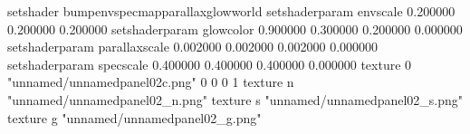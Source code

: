 setshader bumpenvspecmapparallaxglowworld
setshaderparam envscale 0.200000 0.200000 0.200000
setshaderparam glowcolor 0.900000 0.300000 0.200000 0.000000
setshaderparam parallaxscale 0.002000 0.002000 0.002000 0.000000
setshaderparam specscale 0.400000 0.400000 0.400000 0.000000
texture 0 "unnamed/unnamedpanel02c.png" 0 0 0 1
texture n "unnamed/unnamedpanel02_n.png"
texture s "unnamed/unnamedpanel02_s.png"
texture g "unnamed/unnamedpanel02_g.png"